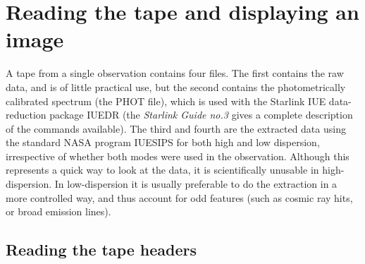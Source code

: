 \section{Reading the tape and displaying an image}

A tape from a single observation contains four files. The first contains the 
raw data, and is of little practical use, but the second contains the 
photometrically calibrated spectrum (the PHOT file), which is used with the
Starlink IUE data-reduction package IUEDR (the {\it Starlink Guide no.3}
gives a complete description of the commands available). The third and fourth 
are the extracted data using the standard NASA program IUESIPS for both 
high and low dispersion, irrespective of whether both modes were used in the
observation. Although this represents a quick way to look at the data, it is
scientifically unusable in high-dispersion. In low-dispersion it is usually 
preferable to do the extraction in a more controlled way, and thus account
for odd features (such as cosmic ray hits, or broad emission lines). 

\subsection{Reading the tape headers}

